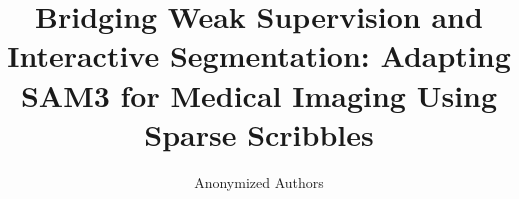 \documentclass[runningheads]{llncs}
\begin{document}
%
\title{Bridging Weak Supervision and Interactive Segmentation: Adapting SAM3 for Medical Imaging Using Sparse Scribbles}
%

\author{Anonymized Authors}  %
  
\maketitle              %
\end{document}
